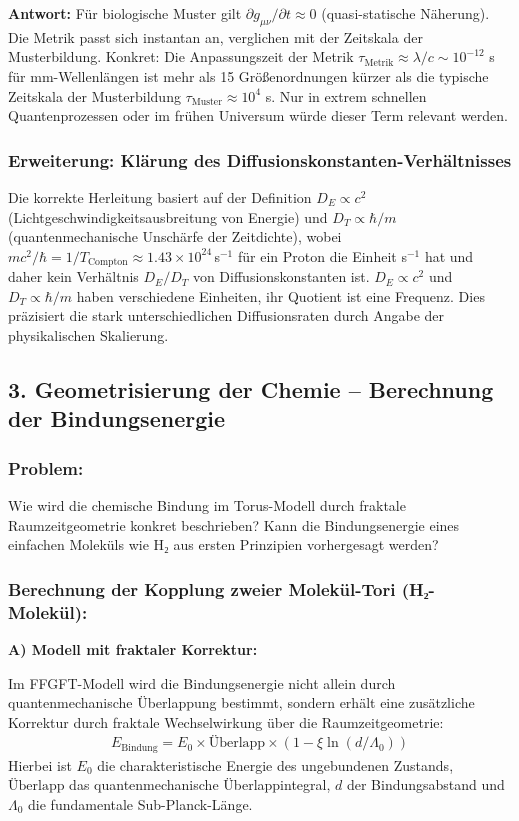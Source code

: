\textbf{Antwort:} Für biologische Muster gilt $\partial g_{\mu\nu}/\partial t \approx 0$ (quasi-statische Näherung). Die Metrik passt sich instantan an, verglichen mit der Zeitskala der Musterbildung. Konkret: Die Anpassungszeit der Metrik $\tau_{\text{Metrik}} \approx \lambda/c \sim 10^{-12}$ s für mm-Wellenlängen ist mehr als 15 Größenordnungen kürzer als die typische Zeitskala der Musterbildung $\tau_{\text{Muster}} \approx 10^4$ s. Nur in extrem schnellen Quantenprozessen oder im frühen Universum würde dieser Term relevant werden.

\subsubsection*{Erweiterung: Klärung des Diffusionskonstanten-Verhältnisses}
Die korrekte Herleitung basiert auf der Definition $D_E \propto c^2$ (Lichtgeschwindigkeitsausbreitung von Energie) und $D_T \propto \hbar / m$ (quantenmechanische Unschärfe der Zeitdichte), wobei $m c^2 / \hbar = 1 / T_{\text{Compton}} \approx 1.43 \times 10^{24}$\,s$^{-1}$ für ein Proton die Einheit s$^{-1}$ hat und daher kein Verhältnis $D_E / D_T$ von Diffusionskonstanten ist. $D_E \propto c^2$ und $D_T \propto \hbar/m$ haben verschiedene Einheiten, ihr Quotient ist eine Frequenz. Dies präzisiert die stark unterschiedlichen Diffusionsraten durch Angabe der physikalischen Skalierung.

\subsection*{3. Geometrisierung der Chemie – Berechnung der Bindungsenergie}

\subsubsection*{Problem:}
Wie wird die chemische Bindung im Torus-Modell durch fraktale Raumzeitgeometrie konkret beschrieben? Kann die Bindungsenergie eines einfachen Moleküls wie H₂ aus ersten Prinzipien vorhergesagt werden?

\subsubsection*{Berechnung der Kopplung zweier Molekül-Tori (H₂-Molekül):}

\textbf{A) Modell mit fraktaler Korrektur:}

Im FFGFT-Modell wird die Bindungsenergie nicht allein durch quantenmechanische Überlappung bestimmt, sondern erhält eine zusätzliche Korrektur durch fraktale Wechselwirkung über die Raumzeitgeometrie:
\begin{align*}
	E_{\text{Bindung}} = E_0 \times \text{Überlapp} \times \left(1 - \xi \ln(d/\Lambda_0)\right)
\end{align*}
Hierbei ist $E_0$ die charakteristische Energie des ungebundenen Zustands, $\text{Überlapp}$ das quantenmechanische Überlappintegral, $d$ der Bindungsabstand und $\Lambda_0$ die fundamentale Sub-Planck-Länge.

